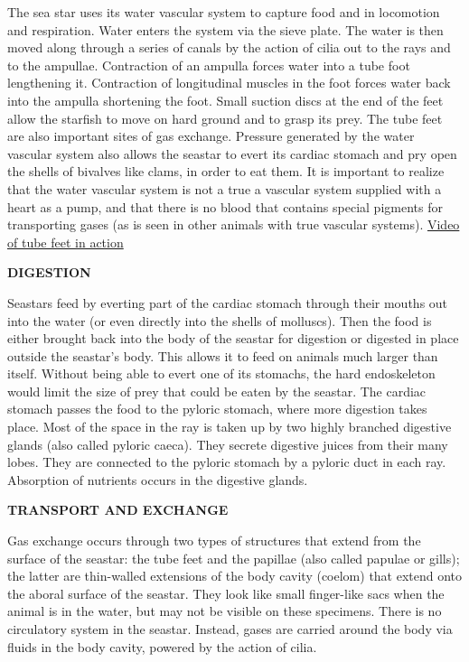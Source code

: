 \documentclass[
]{book}
\begin{document}
The sea star uses its water vascular system to capture food and in locomotion and respiration. Water enters the system via the sieve plate. The water is then moved along through a series of canals by the action of cilia out to the rays and to the ampullae. Contraction of an ampulla forces water into a tube foot lengthening it. Contraction of longitudinal muscles in the foot forces water back into the ampulla shortening the foot. Small suction discs at the end of the feet allow the starfish to move on hard ground and to grasp its prey. The tube feet are also important sites of gas exchange. Pressure generated by the water vascular system also allows the seastar to evert its cardiac stomach and pry open the shells of bivalves like clams, in order to eat them. It is important to realize that the water vascular system is not a true a vascular system supplied with a heart as a pump, and that there is no blood that contains special pigments for transporting gases (as is seen in other animals with true vascular systems). \href{http://www.youtube.com/watch?v=p0VM67cQUWw\&feature=related}{Video of tube feet in action}

\textbf{DIGESTION}

Seastars feed by everting part of the cardiac stomach through their mouths out into the water (or even directly into the shells of molluscs). Then the food is either brought back into the body of the seastar for digestion or digested in place outside the seastar's body. This allows it to feed on animals much larger than itself. Without being able to evert one of its stomachs, the hard endoskeleton would limit the size of prey that could be eaten by the seastar. The cardiac stomach passes the food to the pyloric stomach, where more digestion takes place. Most of the space in the ray is taken up by two highly branched digestive glands (also called pyloric caeca). They secrete digestive juices from their many lobes. They are connected to the pyloric stomach by a pyloric duct in each ray. Absorption of nutrients occurs in the digestive glands.

\textbf{TRANSPORT AND EXCHANGE}

Gas exchange occurs through two types of structures that extend from the surface of the seastar: the tube feet and the papillae (also called papulae or gills); the latter are thin-walled extensions of the body cavity (coelom) that extend onto the aboral surface of the seastar. They look like small finger-like sacs when the animal is in the water, but may not be visible on these specimens. There is no circulatory system in the seastar. Instead, gases are carried around the body via fluids in the body cavity, powered by the action of cilia.
\end{document}
